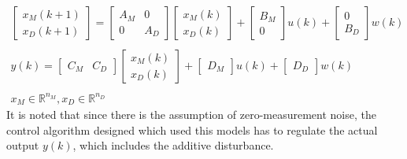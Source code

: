 \documentclass[a4paper]{article}
\begin{document}
\begin{equation}
\begin{matrix}
\begin{bmatrix}
x_M(k+1) \\ x_D(k+1)
\end{bmatrix}
=
\begin{bmatrix}
A_M & 0 \\
0 & A_D
\end{bmatrix}
\begin{bmatrix}
x_M(k) \\ x_D(k)
\end{bmatrix}
+
\begin{bmatrix}
B_M \\ 0
\end{bmatrix}u(k)
+
\begin{bmatrix}
0 \\ B_D
\end{bmatrix}w(k) \\ \\
y(k) = 
\begin{bmatrix}
C_M & C_D
\end{bmatrix}
\begin{bmatrix}
x_M(k) \\ x_D(k)
\end{bmatrix}
+
\begin{bmatrix}
D_M 
\end{bmatrix}u(k)
+
\begin{bmatrix}
 D_D
\end{bmatrix}w(k) \\ \\
x_M \in \mathbb{R}^{n_M}, x_D \in \mathbb{R}^{n_D}
\end{matrix}
\end{equation}
It is noted that since there is the assumption of zero-measurement noise, the control algorithm designed which used this models has to regulate the actual output $y(k)$, which includes the additive disturbance. 
\end{document}
